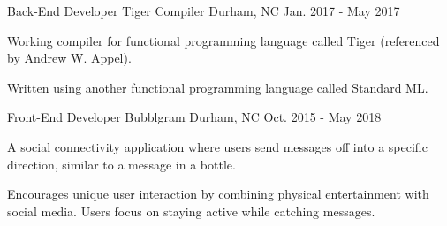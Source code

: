 \begin{cventries}
  \cventry
    {Back-End Developer}
    {Tiger Compiler}
    {Durham, NC}
    {Jan. 2017 - May 2017}
    {
      \begin{cvitems}
        \item {Working compiler for functional programming language called Tiger (referenced by Andrew W. Appel).}
        \item {Written using another functional programming language called Standard ML.}
      \end{cvitems}
    }
  \cventry
    {Front-End Developer}
    {Bubblgram}
    {Durham, NC}
    {Oct. 2015 - May 2018}
    {
      \begin{cvitems}
        \item {A social connectivity application where users send messages off into a specific direction, similar to a message in a bottle. }
        \item {Encourages unique user interaction by combining physical entertainment with social media. Users focus on staying active while catching messages.}
      \end{cvitems}
    }
\end{cventries}
